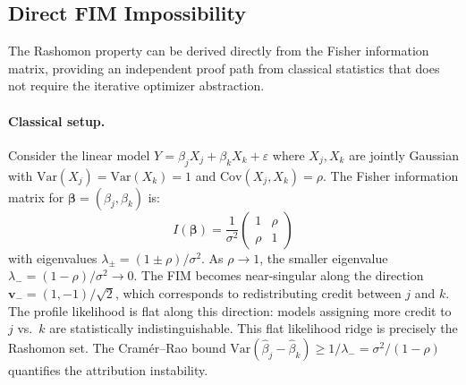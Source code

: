 \documentclass{jmlr}
\newcommand{\Var}{\mathrm{Var}}
\begin{document}
\subsection{Direct FIM Impossibility}
\label{sec:fim}

The Rashomon property can be derived directly from the Fisher information matrix, providing an independent proof path from classical statistics that does not require the iterative optimizer abstraction.

\paragraph{Classical setup.}
Consider the linear model $Y = \beta_j X_j + \beta_k X_k + \varepsilon$ where $X_j, X_k$ are jointly Gaussian with $\Var(X_j) = \Var(X_k) = 1$ and $\text{Cov}(X_j, X_k) = \rho$. The Fisher information matrix for $\boldsymbol{\beta} = (\beta_j, \beta_k)$ is:
\[
    I(\boldsymbol{\beta}) = \frac{1}{\sigma^2}\begin{pmatrix} 1 & \rho \\ \rho & 1 \end{pmatrix}
\]
with eigenvalues $\lambda_\pm = (1 \pm \rho)/\sigma^2$. As $\rho \to 1$, the smaller eigenvalue $\lambda_- = (1-\rho)/\sigma^2 \to 0$. The FIM becomes near-singular along the direction $\boldsymbol{v}_- = (1, -1)/\sqrt{2}$, which corresponds to redistributing credit between $j$ and $k$. The profile likelihood is flat along this direction: models assigning more credit to $j$ vs.\ $k$ are statistically indistinguishable. This flat likelihood ridge is precisely the Rashomon set. The Cram\'er--Rao bound $\Var(\hat\beta_j - \hat\beta_k) \geq 1/\lambda_- = \sigma^2/(1-\rho)$ quantifies the attribution instability.
\end{document}
